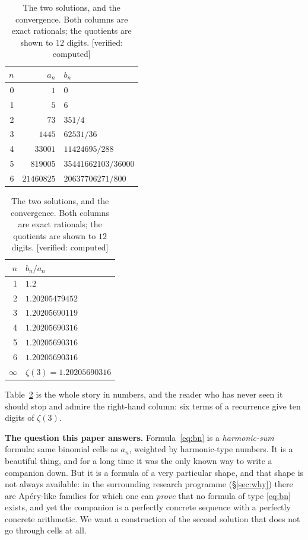 \documentclass[11pt,reqno]{amsart}
\theoremstyle{plain}
\theoremstyle{definition}
\theoremstyle{remark}
\newcommand{\Ver}[1]{\textup{\textsf{[verified: #1]}}}
\numberwithin{equation}{section}
\begin{document}
\begin{table}[t]
\centering
\begin{tabular}{@{}rrl@{}}
\toprule
$n$ & $a_n$ & $b_n$\\
\midrule
0 & $1$ & $0$\\
1 & $5$ & $6$\\
2 & $73$ & $351/4$\\
3 & $1445$ & $62531/36$\\
4 & $33001$ & $11424695/288$\\
5 & $819005$ & $35441662103/36000$\\
6 & $21460825$ & $20637706271/800$\\
\bottomrule
\end{tabular}
\qquad
\begin{tabular}{@{}rl@{}}
\toprule
$n$ & $b_n/a_n$\\
\midrule
1 & $1.2$\\
2 & $1.20205479452$\\
3 & $1.20205690119$\\
4 & $1.20205690316$\\
5 & $1.20205690316$\\
6 & $1.20205690316$\\
$\infty$ & $\zeta(3)=1.20205690316$\\
\bottomrule
\end{tabular}
\medskip
\caption{The two solutions, and the convergence.  Both columns are exact
rationals; the quotients are shown to $12$ digits. \Ver{computed}}
\label{tab:ab}
\end{table}

Table~\ref{tab:ab} is the whole story in numbers, and the reader who has never
seen it should stop and admire the right-hand column: six terms of a recurrence
give ten digits of $\zeta(3)$.

\medskip
\noindent\textbf{The question this paper answers.} Formula~\eqref{eq:bn} is a
\emph{harmonic-sum} formula: same binomial cells as $a_n$, weighted by
harmonic-type numbers. It is a beautiful thing, and for a long time it was the
only known way to write a companion down. But it is a formula of a very
particular shape, and that shape is not always available: in the surrounding
research programme (\S\ref{sec:why}) there are Ap\'ery-like families for which
one can \emph{prove} that no formula of type \eqref{eq:bn} exists, and yet the
companion is a perfectly concrete sequence with a perfectly concrete
arithmetic. We want a construction of the second solution that does not go
through cells at all.
\end{document}
